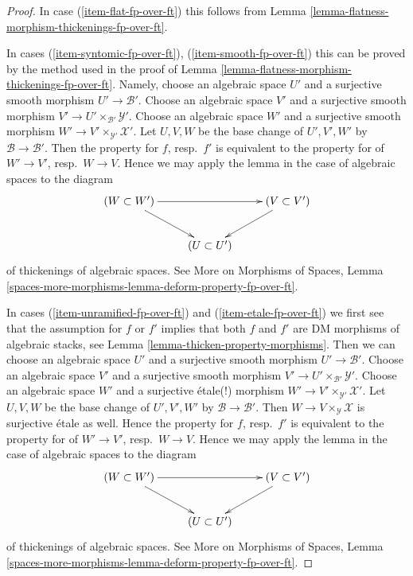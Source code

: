\documentclass{stacks-project}
\theoremstyle{plain}
\theoremstyle{definition}
\theoremstyle{remark}
\numberwithin{equation}{subsection}
\begin{document}
\begin{proof}
In case (\ref{item-flat-fp-over-ft}) this follows from
Lemma \ref{lemma-flatness-morphism-thickenings-fp-over-ft}.

\medskip\noindent
In cases
(\ref{item-syntomic-fp-over-ft}), (\ref{item-smooth-fp-over-ft})
this can be proved by the method used in the proof of
Lemma \ref{lemma-flatness-morphism-thickenings-fp-over-ft}.
Namely, choose an algebraic space $U'$ and a surjective smooth morphism
$U' \to \mathcal{B}'$.
Choose an algebraic space $V'$ and a surjective smooth morphism
$V' \to U' \times_{\mathcal{B}'} \mathcal{Y}'$.
Choose an algebraic space $W'$ and a surjective smooth morphism
$W' \to V' \times_{\mathcal{Y}'} \mathcal{X}'$. Let $U, V, W$
be the base change of $U', V', W'$ by $\mathcal{B} \to \mathcal{B}'$.
Then the property for $f$, resp.\ $f'$
is equivalent to the property for of $W' \to V'$, resp.\ $W \to V$.
Hence we may apply the lemma in the case of algebraic spaces to the
diagram
$$
\xymatrix{
(W \subset W') \ar[rr] \ar[rd] & & (V \subset V') \ar[ld] \\
& (U \subset U')
}
$$
of thickenings of algebraic spaces. See
More on Morphisms of Spaces, Lemma
\ref{spaces-more-morphisms-lemma-deform-property-fp-over-ft}.

\medskip\noindent
In cases (\ref{item-unramified-fp-over-ft}) and (\ref{item-etale-fp-over-ft})
we first see that the assumption for $f$ or $f'$ implies that both
$f$ and $f'$ are DM morphisms of algebraic stacks, see
Lemma \ref{lemma-thicken-property-morphisms}. Then we can choose
an algebraic space $U'$ and a surjective smooth morphism
$U' \to \mathcal{B}'$.
Choose an algebraic space $V'$ and a surjective smooth morphism
$V' \to U' \times_{\mathcal{B}'} \mathcal{Y}'$.
Choose an algebraic space $W'$ and a surjective \'etale(!) morphism
$W' \to V' \times_{\mathcal{Y}'} \mathcal{X}'$. Let $U, V, W$
be the base change of $U', V', W'$ by $\mathcal{B} \to \mathcal{B}'$.
Then $W \to V \times_\mathcal{Y} \mathcal{X}$ is surjective
\'etale as well. Hence the property for $f$, resp.\ $f'$
is equivalent to the property for of $W' \to V'$, resp.\ $W \to V$.
Hence we may apply the lemma in the case of algebraic spaces to the
diagram
$$
\xymatrix{
(W \subset W') \ar[rr] \ar[rd] & & (V \subset V') \ar[ld] \\
& (U \subset U')
}
$$
of thickenings of algebraic spaces. See
More on Morphisms of Spaces, Lemma
\ref{spaces-more-morphisms-lemma-deform-property-fp-over-ft}.


\end{proof}
\end{document}

